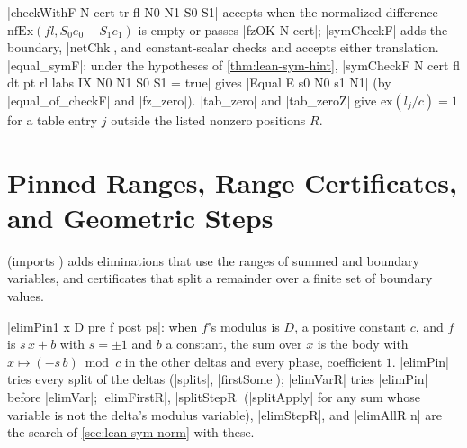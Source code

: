 \begin{theorem}\label{thm:lean-sym-equal-symF}
\lean|checkWithF N cert tr fl N0 N1 S0 S1| accepts when the normalized difference $\mathrm{nfEx}(fl,S_0e_0-S_1e_1)$ is empty or passes \lean|fzOK N cert|; \lean|symCheckF| adds the boundary, \lean|netChk|, and constant-scalar checks and accepts either translation. \lean|equal_symF|: under the hypotheses of \cref{thm:lean-sym-hint}, \lean|symCheckF N cert fl dt pt rl labs IX N0 N1 S0 S1 = true| gives \lean|Equal E s0 N0 s1 N1| (by \lean|equal_of_checkF| and \lean|fz_zero|). \lean|tab_zero| and \lean|tab_zeroZ| give $\mathrm{ex}(l_j/c)=1$ for a table entry $j$ outside the listed nonzero positions $R$.
\end{theorem}

\section{Pinned Ranges, Range Certificates, and Geometric Steps}\label{sec:lean-sym-range}

 (imports ) adds eliminations that use the ranges of summed and boundary variables, and certificates that split a remainder over a finite set of boundary values.

\begin{definition}\label{def:lean-sym-elimPin}
\lean|elimPin1 x D pre f post ps|: when $f$'s modulus is $D$, a positive constant $c$, and $f$ is $s\,x+b$ with $s=\pm1$ and $b$ a constant, the sum over $x$ is the body with $x\mapsto(-s\,b)\bmod c$ in the other deltas and every phase, coefficient $1$. \lean|elimPin| tries every split of the deltas (\lean|splits|, \lean|firstSome|); \lean|elimVarR| tries \lean|elimPin| before \lean|elimVar|; \lean|elimFirstR|, \lean|splitStepR| (\lean|splitApply| for any sum whose variable is not the delta's modulus variable), \lean|elimStepR|, and \lean|elimAllR n| are the search of \cref{sec:lean-sym-norm} with these.
\end{definition}

